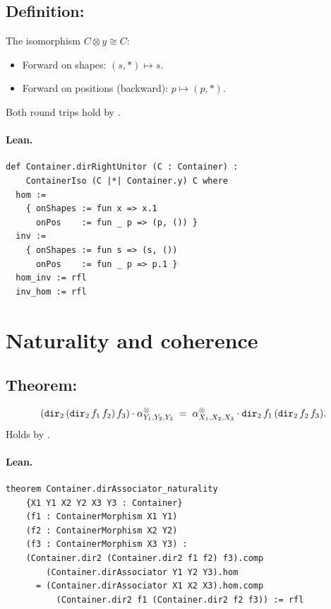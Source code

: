 \documentclass[11pt,a4paper]{article}
\begin{document}
\subsection{Definition: }

\begin{defn}
The isomorphism $C \otimes y \cong C$:
\begin{itemize}
  \item Forward on shapes: $(s, \ast) \mapsto s$.
  \item Forward on positions (backward): $p \mapsto (p, \ast)$.
\end{itemize}
Both round trips hold by .
\end{defn}

\paragraph{Lean.}
\begin{lstlisting}[style=lean]
def Container.dirRightUnitor (C : Container) :
    ContainerIso (C |*| Container.y) C where
  hom :=
    { onShapes := fun x => x.1
      onPos    := fun _ p => (p, ()) }
  inv :=
    { onShapes := fun s => (s, ())
      onPos    := fun _ p => p.1 }
  hom_inv := rfl
  inv_hom := rfl
\end{lstlisting}


\section{Naturality and coherence}

\subsection{Theorem: }

\begin{thm}
\[
  (\texttt{dir}_2\,(\texttt{dir}_2\,f_1\,f_2)\,f_3) \cdot \alpha^\otimes_{Y_1,Y_2,Y_3}
  \;=\;
  \alpha^\otimes_{X_1,X_2,X_3} \cdot \texttt{dir}_2\,f_1\,(\texttt{dir}_2\,f_2\,f_3).
\]
Holds by .
\end{thm}

\paragraph{Lean.}
\begin{lstlisting}[style=lean]
theorem Container.dirAssociator_naturality
    {X1 Y1 X2 Y2 X3 Y3 : Container}
    (f1 : ContainerMorphism X1 Y1)
    (f2 : ContainerMorphism X2 Y2)
    (f3 : ContainerMorphism X3 Y3) :
    (Container.dir2 (Container.dir2 f1 f2) f3).comp
        (Container.dirAssociator Y1 Y2 Y3).hom
      = (Container.dirAssociator X1 X2 X3).hom.comp
          (Container.dir2 f1 (Container.dir2 f2 f3)) := rfl
\end{lstlisting}
\end{document}
